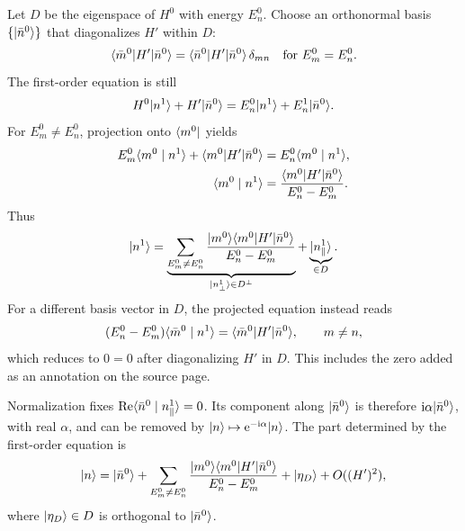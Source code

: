 Let $D$ be the eigenspace of $H^0$ with energy $E_n^0$. Choose an
orthonormal basis $\{\lvert \bar n^0\rangle\}$ that diagonalizes $H'$ within $D$:
\[
 \langle \bar m^0\rvert H'\lvert \bar n^0\rangle
 =\langle \bar n^0\rvert H'\lvert \bar n^0\rangle\,\delta_{mn}
 \quad\text{for }E_m^0=E_n^0.
\]
The first-order equation is still
\[
 H^0\lvert n^1\rangle+H'\lvert \bar n^0\rangle
 =E_n^0\lvert n^1\rangle+E_n^1\lvert \bar n^0\rangle.
\]
For $E_m^0\ne E_n^0$, projection onto $\langle m^0\rvert$ yields
\begin{align*}
 E_m^0\langle m^0\mid n^1\rangle+\langle m^0\rvert H'\lvert \bar n^0\rangle
 &=E_n^0\langle m^0\mid n^1\rangle,\\
 \langle m^0\mid n^1\rangle
 &=\frac{\langle m^0\rvert H'\lvert \bar n^0\rangle}{E_n^0-E_m^0}.
\end{align*}
Thus
\[
 \lvert n^1\rangle=
 \underbrace{\sum_{E_m^0\ne E_n^0}
 \frac{\lvert m^0\rangle\langle m^0\rvert H'\lvert \bar n^0\rangle}{E_n^0-E_m^0}}
 _{\lvert n^1_\perp\rangle\in D^\perp}
 +\underbrace{\lvert n^1_\parallel\rangle}_{\in D}.
\]
For a different basis vector in $D$, the projected equation instead reads
\[
 (E_n^0-E_m^0)\langle \bar m^0\mid n^1\rangle
 =\langle \bar m^0\rvert H'\lvert \bar n^0\rangle,\qquad m\ne n,
\]
which reduces to $0=0$ after diagonalizing $H'$ in $D$. This includes the
zero added as an annotation on the source page.

Normalization fixes
$\operatorname{Re}\langle \bar n^0\mid n^1_\parallel\rangle=0$. Its component
along $\lvert \bar n^0\rangle$ is therefore $\mathrm{i}\alpha\lvert \bar n^0\rangle$, with real
$\alpha$, and can be removed by $\lvert n\rangle\mapsto\mathrm{e}^{-\mathrm{i}\alpha}\lvert n\rangle$.
The part determined by the first-order equation is
\[
 \lvert n\rangle=\lvert \bar n^0\rangle
 +\sum_{E_m^0\ne E_n^0}
 \frac{\lvert m^0\rangle\langle m^0\rvert H'\lvert \bar n^0\rangle}{E_n^0-E_m^0}
 +\lvert \eta_D\rangle+O((H')^2),
\]
where $\lvert \eta_D\rangle\in D$ is orthogonal to $\lvert \bar n^0\rangle$.
